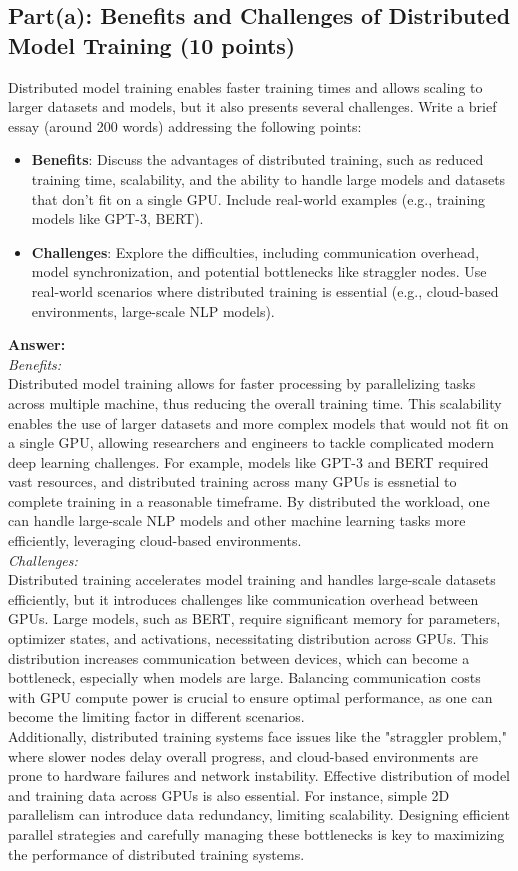 \documentclass[11pt, oneside]{article}   	%
\begin{document}
\subsection*{Part(a): Benefits and Challenges of Distributed Model Training (10 points)} 
Distributed model training enables faster training times and allows scaling to larger datasets and models, but it also presents several challenges. Write a brief essay (around 200 words) addressing the following points:
\begin{itemize}
    \item \textbf{Benefits}: Discuss the advantages of distributed training, such as reduced training time, scalability, and the ability to handle large models and datasets that don’t fit on a single GPU. Include real-world examples (e.g., training models like GPT-3, BERT).
    \item \textbf{Challenges}: Explore the difficulties, including communication overhead, model synchronization, and potential bottlenecks like straggler nodes. Use real-world scenarios where distributed training is essential (e.g., cloud-based environments, large-scale NLP models).
\end{itemize}

\textbf{Answer:}
\\
\textit{Benefits: }
\\
Distributed model training allows for faster processing by parallelizing tasks across multiple machine, thus reducing the overall training time. 
This scalability enables the use of larger datasets and more complex models that would not fit on a single GPU, allowing researchers and engineers to tackle 
complicated modern deep learning challenges. For example, models like GPT-3 and BERT required vast resources, and distributed training across many GPUs is essnetial
to complete training in a reasonable timeframe. By distributed the workload, one can handle large-scale NLP models and other machine learning tasks more efficiently, 
leveraging cloud-based environments.
\\
\textit{Challenges: }
\\
Distributed training accelerates model training and handles large-scale datasets efficiently, but it introduces challenges like communication overhead between GPUs. Large models, such as BERT, require significant memory for parameters, optimizer states, and activations, necessitating distribution across GPUs. This distribution increases communication between devices, which can become a bottleneck, especially when models are large. Balancing communication costs with GPU compute power is crucial to ensure optimal performance, as one can become the limiting factor in different scenarios.
\\
Additionally, distributed training systems face issues like the "straggler problem," where slower nodes delay overall progress, and cloud-based environments are prone to hardware failures and network instability. Effective distribution of model and training data across GPUs is also essential. For instance, simple 2D parallelism can introduce data redundancy, limiting scalability. Designing efficient parallel strategies and carefully managing these bottlenecks is key to maximizing the performance of distributed training systems.
\end{document}
